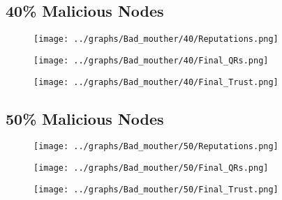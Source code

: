 \documentclass{article}
\begin{document}
  \begin{minipage}[t]{0.49\columnwidth}
    \subsection*{40\% Malicious Nodes}
        \begin{figure}[H]
            \centering
            \texttt{[image: ../graphs/Bad\_mouther/40/Reputations.png]}
        \end{figure}
        \begin{figure}[H]
            \centering
            \texttt{[image: ../graphs/Bad\_mouther/40/Final\_QRs.png]}
        \end{figure}
    \end{minipage}
    \begin{minipage}[t]{0.49\columnwidth}
        \begin{figure}[H]
            \centering
            \texttt{[image: ../graphs/Bad\_mouther/40/Final\_Trust.png]}
        \end{figure}
    \end{minipage}

  \begin{minipage}[t]{0.49\columnwidth}
    \subsection*{50\% Malicious Nodes}
        \begin{figure}[H]
            \centering
            \texttt{[image: ../graphs/Bad\_mouther/50/Reputations.png]}
        \end{figure}
        \begin{figure}[H]
            \centering
            \texttt{[image: ../graphs/Bad\_mouther/50/Final\_QRs.png]}
        \end{figure}
    \end{minipage}
    \begin{minipage}[t]{0.49\columnwidth}
        \begin{figure}[H]
            \centering
            \texttt{[image: ../graphs/Bad\_mouther/50/Final\_Trust.png]}
        \end{figure}
    \end{minipage}
\end{document}
